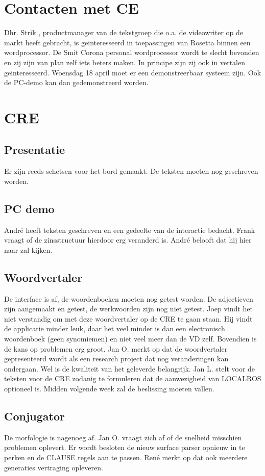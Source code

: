\section {Contacten met CE}
Dhr. Strik , productmanager van de tekstgroep die o.a. de videowriter op de 
markt heeft gebracht, is geinteresseerd in toepassingen van Rosetta binnen een 
wordprocessor. De Smit Corona personal wordprocessor wordt te slecht bevonden 
en zij zijn van plan zelf iets beters maken. In principe zijn zij ook in vertalen 
geinteresseerd. Woensdag 18 april moet er een demonstreerbaar systeem zijn. Ook 
de PC-demo kan dan gedemonstreerd worden.

\section {CRE}

\subsection {Presentatie} 
Er zijn reeds schetsen voor het bord gemaakt. De teksten moeten nog geschreven 
worden.

\subsection {PC demo} 
Andr\'{e} heeft teksten geschreven en een gedeelte van de interactie bedacht. Frank 
vraagt of de zinsstructuur hierdoor erg veranderd is. Andr\'{e} belooft dat hij
hier naar zal kijken.

\subsection {Woordvertaler}
De interface is af, de woordenboeken moeten nog getest worden. De adjectieven 
zijn aangemaakt en getest, de werkwoorden zijn nog niet getest. Joep vindt het 
niet verstandig om met deze woordvertaler op de CRE te gaan staan. Hij vindt de 
applicatie minder leuk, daar het veel minder is dan een electronisch 
woordenboek (geen synomiemen) en niet veel meer dan de VD zelf. Bovendien is de 
kans op problemen erg groot. Jan O. merkt op dat de woordvertaler gepresenteerd 
wordt als een research project dat nog veranderingen kan ondergaan. Wel is de 
kwaliteit van het geleverde belangrijk. Jan L. stelt voor de teksten voor de CRE
zodanig te formuleren dat de aanwezigheid van LOCALROS optioneel is. Midden 
volgende week zal de beslissing moeten vallen.

\subsection {Conjugator}
De morfologie is nagenoeg af. Jan O. vraagt zich af of de snelheid misschien 
problemen oplevert. Er wordt besloten de nieuw surface parser opnieuw in te 
perken en de CLAUSE regels aan te passen. Ren\'{e} merkt op dat ook meerdere 
generaties vertraging opleveren.

